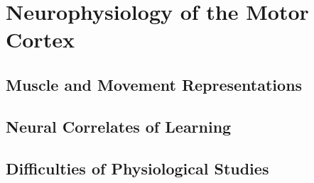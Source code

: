 \section{Neurophysiology of the Motor Cortex}

\subsection{Muscle and Movement Representations}

\subsection{Neural Correlates of Learning}

\subsection{Difficulties of Physiological Studies}